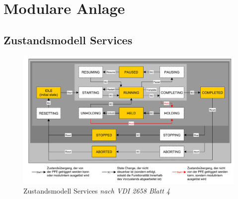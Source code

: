 \chapter{Modulare Anlage}
\section{Zustandsmodell Services}
\label{A:Zustandsmodell-Services}

 \begin{figure}[htbp]
 \centering
 \includegraphics[scale=0.34]{DA_files/Bilder/Anhang/Zustandsdiagramm-Services.pdf}
 \caption[Zustandsmodell Services \textit{nach VDI 2658 Blatt 4}]{Zustandsmodell Services \textit{nach VDI 2658 Blatt 4} \citep[]{VDI2658-Blatt4}}
 \label{pic:Zustandsmodell-Service}
 \end{figure}
 
